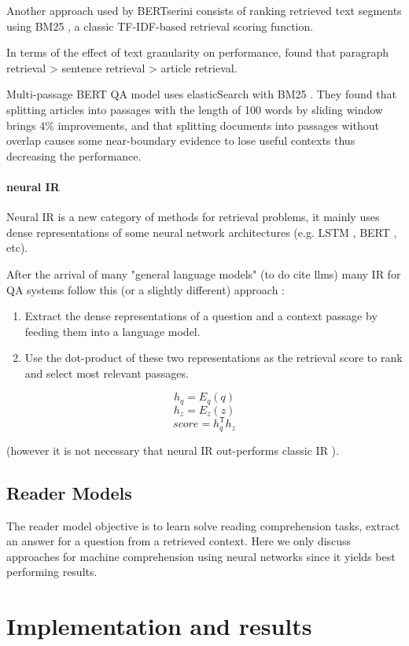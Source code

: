 \documentclass[a4paper,12pt]{article}
\begin{document}
Another approach used by BERTserini \cite{BERTserini} consists of ranking retrieved text segments using BM25 \cite{BM25}, a classic TF-IDF-based retrieval scoring function.

In terms of the effect of text granularity on performance, \cite{BERTserini} found that paragraph retrieval > sentence retrieval > article retrieval.

Multi-passage BERT QA model \cite{multibert} uses elasticSearch with BM25 \cite{BM25}. They found that splitting articles into passages with the length of 100 words by sliding window brings $4\%$ improvements, and that splitting documents into passages without overlap causes some near-boundary evidence to lose useful contexts thus decreasing the performance.

\paragraph{neural IR}
Neural IR is a new category of methods for retrieval problems, it mainly uses dense representations of some neural network architectures (e.g. LSTM \cite{lstm}, BERT \cite{bert}, etc). 

After the arrival of many "general language models" (to do cite llms) many IR for QA systems follow this (or a slightly different) approach :
\begin{enumerate}
	\item Extract the dense representations of a question and a context passage by feeding them into a language model.
	\item Use the dot-product of these two representations as the retrieval score to rank and select most relevant passages.
\end{enumerate}

$$h_q=E_q(q)$$ 
$$h_z=E_z(z)$$
$$score=h_q^\mathsf{T} h_z$$

(however it is not necessary that neural IR out-performs classic IR \cite{lin}).

\subsection{Reader Models}
The reader model objective is to learn solve reading comprehension tasks, extract an answer for a question from a retrieved context. 
Here we only discuss approaches for machine comprehension using neural networks since it yields best performing results.

\clearpage
\section{Implementation and results}
\end{document}
